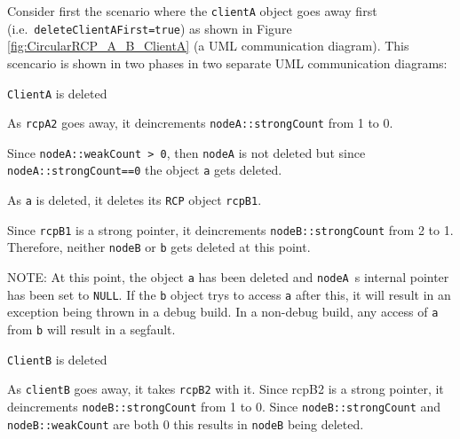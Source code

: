 \documentclass[pdf,ps2pdf,11pt]{SANDreport}
\begin{document}
Consider first the scenario where the {}\texttt{clientA} object goes
away first (i.e.\ {}\texttt{deleteClientAFirst=true}) as shown in
Figure {}\ref{fig:CircularRCP_A_B_ClientA} (a UML communication
diagram).  This scencario is shown in two phases in two separate UML
communication diagrams:

\begin{description}

{}\item[a)] {}\texttt{ClientA} is deleted

  \begin{description}

  {}\item[a.1)] As {}\texttt{rcpA2} goes away, it deincrements
  {}\texttt{nodeA::strongCount} from 1 to 0.

  {}\item[a.2)] Since {}\texttt{nodeA::weakCount > 0}, then
  {}\texttt{nodeA} is not deleted but since
  {}\texttt{nodeA::strongCount==0} the object {}\texttt{a} gets
  deleted.

  {}\item[a.3)] As {}\texttt{a} is deleted, it deletes its
  {}\texttt{RCP} object {}\texttt{rcpB1}.

  {}\item[a.4)] Since {}\texttt{rcpB1} is a strong pointer, it
  deincrements {}\texttt{nodeB::strongCount} from 2 to 1.  Therefore,
  neither {}\texttt{nodeB} or {}\texttt{b} gets deleted at this point.

  NOTE: At this point, the object {}\texttt{a} has been deleted and
  {}\texttt{nodeA}~s internal pointer has been set to {}\texttt{NULL}.
  If the {}\texttt{b} object trys to access {}\texttt{a} after this,
  it will result in an exception being thrown in a debug build.  In a
  non-debug build, any access of {}\texttt{a} from {}\texttt{b} will
  result in a segfault.

  \end{description}

{}\item[b)] {}\texttt{ClientB} is deleted

  \begin{description}

  {}\item[b.1)] As {}\texttt{clientB} goes away, it takes
  {}\texttt{rcpB2} with it.  Since rcpB2 is a strong pointer, it
  deincrements {}\texttt{nodeB::strongCount} from 1 to 0.  Since
  {}\texttt{nodeB::strongCount} and {}\texttt{nodeB::weakCount} are
  both 0 this results in {}\texttt{nodeB} being deleted.


\end{description}
\end{description}
\end{document}
